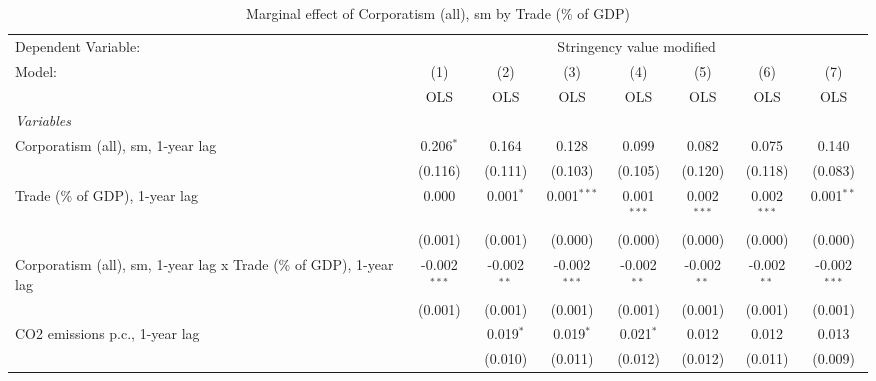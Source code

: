 
\begin{table}[htbp]
   \caption{Marginal effect of Corporatism (all), sm by Trade (\% of GDP)}
   \centering
   \begin{tabular}{lccccccc}
      \toprule
      Dependent Variable: & \multicolumn{7}{c}{Stringency value modified}\\
      Model:                                                             & (1)            & (2)           & (3)            & (4)           & (5)           & (6)           & (7)\\  
                                                                         &  OLS           & OLS           & OLS            & OLS           & OLS           & OLS           & OLS\\  
      \midrule
      \emph{Variables}\\
      Corporatism (all), sm, 1-year lag                                  & 0.206$^{*}$    & 0.164         & 0.128          & 0.099         & 0.082         & 0.075         & 0.140\\   
                                                                         & (0.116)        & (0.111)       & (0.103)        & (0.105)       & (0.120)       & (0.118)       & (0.083)\\   
      Trade (\% of GDP), 1-year lag                                      & 0.000          & 0.001$^{*}$   & 0.001$^{***}$  & 0.001$^{***}$ & 0.002$^{***}$ & 0.002$^{***}$ & 0.001$^{**}$\\   
                                                                         & (0.001)        & (0.001)       & (0.000)        & (0.000)       & (0.000)       & (0.000)       & (0.000)\\   
      Corporatism (all), sm, 1-year lag x Trade (\% of GDP), 1-year lag  & -0.002$^{***}$ & -0.002$^{**}$ & -0.002$^{***}$ & -0.002$^{**}$ & -0.002$^{**}$ & -0.002$^{**}$ & -0.002$^{***}$\\   
                                                                         & (0.001)        & (0.001)       & (0.001)        & (0.001)       & (0.001)       & (0.001)       & (0.001)\\   
      CO2 emissions p.c., 1-year lag                                     &                & 0.019$^{*}$   & 0.019$^{*}$    & 0.021$^{*}$   & 0.012         & 0.012         & 0.013\\   
                                                                         &                & (0.010)       & (0.011)        & (0.012)       & (0.012)       & (0.011)       & (0.009)\\   

\end{tabular}
\end{table}
